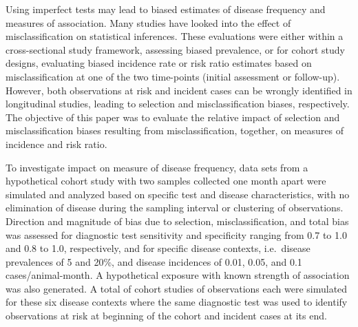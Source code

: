 Using imperfect tests may lead to biased estimates of disease frequency and
measures of association.
Many studies have looked into the effect of misclassification on statistical
inferences.
These evaluations were either within a cross-sectional study framework,
assessing biased prevalence, or for cohort study designs, evaluating biased
incidence rate or risk ratio estimates based on misclassification at one
of the two time-points (initial assessment or follow-up).
However, both observations at risk and incident cases can be wrongly
identified in longitudinal studies, leading to selection and misclassification
biases, respectively.
The objective of this paper was to evaluate the relative impact of selection
and misclassification biases resulting from misclassification, together, on
measures of incidence and risk ratio.

To investigate impact on measure of disease frequency, data sets from a
hypothetical cohort study with two samples collected one month apart were
simulated and analyzed based on specific test and disease characteristics, with
no elimination of disease during the sampling interval or clustering of
observations.
Direction and magnitude of bias due to selection, misclassification, and total
bias was assessed for diagnostic test sensitivity and specificity ranging from
0.7 to 1.0 and 0.8 to 1.0, respectively, and for specific disease contexts,
i.e.\ disease prevalences of 5 and 20\%, and disease incidences of 0.01, 0.05,
and 0.1 cases/animal-month.
A hypothetical exposure with known strength of association
was also generated.
A total of  cohort studies of  observations each
were simulated for these six disease contexts where the same diagnostic test
was used to identify observations at risk at beginning of the cohort and
incident cases at its end.

